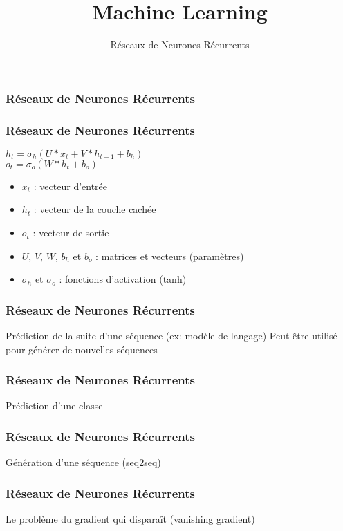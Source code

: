 \documentclass{formation}
\title{Machine Learning}
\subtitle{Réseaux de Neurones Récurrents}
\begin{document}
\maketitle

\begin{frame}
  \frametitle{Réseaux de Neurones Récurrents}
\end{frame}

\begin{frame}
  \frametitle{Réseaux de Neurones Récurrents}
  $h_{t}=\sigma_{h}(U*x_{t}+V*h_{t-1}+b_{h})$ \\
  $o_{t}=\sigma_{o}(W*h_{t}+b_{o})$ \\
  \begin{itemize}
  \item $x_{t}$ : vecteur d'entrée
  \item $h_t$ : vecteur de la couche cachée
  \item $o_{t}$ : vecteur de sortie
  \item $U$, $V$, $W$, $b_h$ et $b_o$ : matrices et vecteurs (paramètres)
  \item $\sigma_{h}$ et $\sigma_o$ : fonctions d'activation (tanh)
  \end{itemize}
\end{frame}

\begin{frame}
  \frametitle{Réseaux de Neurones Récurrents}
  Prédiction de la suite d'une séquence (ex: modèle de langage)
  Peut être utilisé pour générer de nouvelles séquences
\end{frame}

\begin{frame}
  \frametitle{Réseaux de Neurones Récurrents}
  Prédiction d'une classe
\end{frame}

\begin{frame}
  \frametitle{Réseaux de Neurones Récurrents}
  Génération d'une séquence (seq2seq)
\end{frame}

\begin{frame}
  \frametitle{Réseaux de Neurones Récurrents}
  Le problème du gradient qui disparaît (vanishing gradient)
\end{frame}
\end{document}
